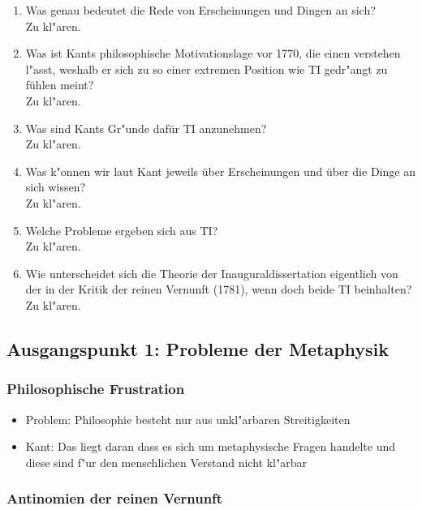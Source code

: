 \documentclass[emulatestandardclasses]{scrartcl}
\begin{document}
\begin{enumerate}
  \item {\color{NavyBlue}Was genau bedeutet die Rede von Erscheinungen und Dingen an sich?}\\
{\color{ForestGreen} Zu kl"aren.}
  \item {\color{NavyBlue} Was ist Kants philosophische Motivationslage vor 1770, die einen verstehen l"asst, weshalb er sich zu so einer extremen Position wie TI gedr"angt zu fühlen meint?}\\
{\color{ForestGreen} Zu kl"aren.}
    \item {\color{NavyBlue} Was sind Kants Gr"unde dafür TI anzunehmen?}\\
{\color{ForestGreen} Zu kl"aren.}
    \item {\color{NavyBlue} Was k"onnen wir laut Kant jeweils über Erscheinungen und
über die Dinge an sich wissen?}\\
{\color{ForestGreen} Zu kl"aren.}
    \item {\color{NavyBlue} Welche Probleme ergeben sich aus TI?}\\
{\color{ForestGreen} Zu kl"aren.}
    \item {\color{NavyBlue} Wie unterscheidet sich die Theorie der Inauguraldissertation
eigentlich von der in der Kritik der reinen Vernunft (1781), wenn doch beide TI beinhalten?}\\
{\color{ForestGreen} Zu kl"aren.}
\end{enumerate}

\subsection{Ausgangspunkt 1: Probleme der Metaphysik}

\subsubsection{Philosophische Frustration}

\begin{itemize}
  \item Problem: Philosophie besteht nur aus unkl"arbaren Streitigkeiten
  \item Kant: Das liegt daran dass es sich um metaphysische Fragen handelte und diese sind f"ur den menschlichen Verstand nicht kl"arbar
\end{itemize}


\subsubsection{Antinomien der reinen Vernunft}
\end{document}
